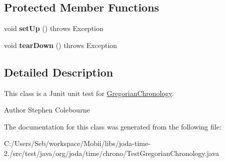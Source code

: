 \subsection*{Protected Member Functions}
\begin{DoxyCompactItemize}
\item 
\hypertarget{classorg_1_1joda_1_1time_1_1chrono_1_1_test_gregorian_chronology_af707d6265dc93f4817e28408cd83c2bb}{void {\bfseries set\-Up} ()  throws Exception }\label{classorg_1_1joda_1_1time_1_1chrono_1_1_test_gregorian_chronology_af707d6265dc93f4817e28408cd83c2bb}

\item 
\hypertarget{classorg_1_1joda_1_1time_1_1chrono_1_1_test_gregorian_chronology_aa41fe428913cd504205800f13e7c0f11}{void {\bfseries tear\-Down} ()  throws Exception }\label{classorg_1_1joda_1_1time_1_1chrono_1_1_test_gregorian_chronology_aa41fe428913cd504205800f13e7c0f11}

\end{DoxyCompactItemize}


\subsection{Detailed Description}
This class is a Junit unit test for \hyperlink{classorg_1_1joda_1_1time_1_1chrono_1_1_gregorian_chronology}{Gregorian\-Chronology}.

\begin{DoxyAuthor}{Author}
Stephen Colebourne 
\end{DoxyAuthor}


The documentation for this class was generated from the following file\-:\begin{DoxyCompactItemize}
\item 
C\-:/\-Users/\-Seb/workspace/\-Mobii/libs/joda-\/time-\/2./src/test/java/org/joda/time/chrono/Test\-Gregorian\-Chronology.\-java\end{DoxyCompactItemize}
